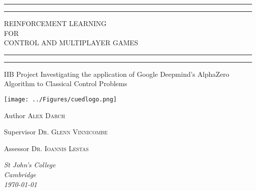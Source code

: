 \documentclass[../main.tex]{subfiles}
\begin{document}
\begin{titlepage} %

	\centering %
	\scshape %
	\vspace*{\baselineskip} %
	\rule{\textwidth}{1.6pt}\vspace*{-\baselineskip}\vspace*{2pt} %
	\rule{\textwidth}{0.4pt} %
	\vspace{0.75\baselineskip} %
	
	{\LARGE REINFORCEMENT LEARNING \\ FOR \\ CONTROL AND MULTIPLAYER GAMES \\} %
	
	\vspace{0.75\baselineskip} %
	\rule{\textwidth}{0.4pt}\vspace*{-\baselineskip}\vspace{3.2pt} %
	\rule{\textwidth}{1.6pt} %
	\vspace{1\baselineskip} %
	
	
	IIB Project Investigating the application of Google Deepmind's AlphaZero Algorithm to Classical Control Problems 
	
    \vspace*{4\baselineskip} %
    \texttt{[image: ../Figures/cuedlogo.png]}
    \vspace*{3\baselineskip} %
	
	
	Author
	\vspace{0.5\baselineskip} %
    {\scshape\Large Alex Darch} %

    Supervisor
	\vspace{0.5\baselineskip} %
    {\scshape\Large Dr. Glenn Vinnicombe} %
    
    Assessor
	\vspace{0.5\baselineskip} %
	{\scshape\Large Dr. Ioannis Lestas} %
    	
	\vfill %
	\vspace{0.3\baselineskip} %
    \textit{St John's College \\ Cambridge \\ \today}

\end{titlepage}
\end{document}
